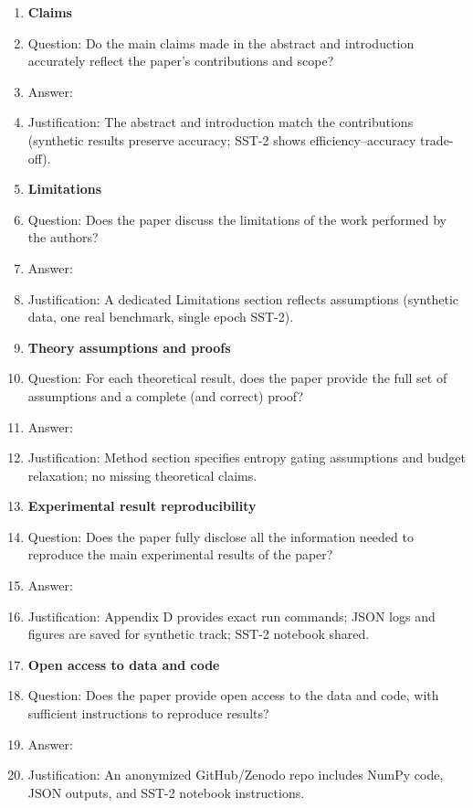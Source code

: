 \documentclass{article}
\begin{document}
\begin{enumerate}

\item {\bf Claims}  
\item[] Question: Do the main claims made in the abstract and introduction accurately reflect the paper's contributions and scope?  
\item[] Answer: \answerYes{}  
\item[] Justification: The abstract and introduction match the contributions (synthetic results preserve accuracy; SST-2 shows efficiency–accuracy trade-off).

\item {\bf Limitations}  
\item[] Question: Does the paper discuss the limitations of the work performed by the authors?  
\item[] Answer: \answerYes{}  
\item[] Justification: A dedicated Limitations section reflects assumptions (synthetic data, one real benchmark, single epoch SST-2).

\item {\bf Theory assumptions and proofs}  
\item[] Question: For each theoretical result, does the paper provide the full set of assumptions and a complete (and correct) proof?  
\item[] Answer: \answerYes{}  
\item[] Justification: Method section specifies entropy gating assumptions and budget relaxation; no missing theoretical claims.

\item {\bf Experimental result reproducibility}  
\item[] Question: Does the paper fully disclose all the information needed to reproduce the main experimental results of the paper?  
\item[] Answer: \answerYes{}  
\item[] Justification: Appendix D provides exact run commands; JSON logs and figures are saved for synthetic track; SST-2 notebook shared.

\item {\bf Open access to data and code}  
\item[] Question: Does the paper provide open access to the data and code, with sufficient instructions to reproduce results?  
\item[] Answer: \answerYes{}  
\item[] Justification: An anonymized GitHub/Zenodo repo includes NumPy code, JSON outputs, and SST-2 notebook instructions.


\end{enumerate}
\end{document}
